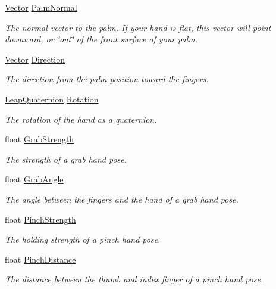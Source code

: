 \begin{DoxyCompactItemize}
\mbox{\hyperlink{struct_leap_1_1_vector}{Vector}} \mbox{\hyperlink{class_leap_1_1_hand_a32586524eb04a8d5b9ed6559285fb1d1}{Palm\+Normal}}
\begin{DoxyCompactList}\small\item\em The normal vector to the palm. If your hand is flat, this vector will point downward, or \char`\"{}out\char`\"{} of the front surface of your palm. \end{DoxyCompactList}\item 
\mbox{\hyperlink{struct_leap_1_1_vector}{Vector}} \mbox{\hyperlink{class_leap_1_1_hand_a1b743a48862aac8d04be2bb54588f3bf}{Direction}}
\begin{DoxyCompactList}\small\item\em The direction from the palm position toward the fingers. \end{DoxyCompactList}\item 
\mbox{\hyperlink{struct_leap_1_1_leap_quaternion}{Leap\+Quaternion}} \mbox{\hyperlink{class_leap_1_1_hand_ad1f22c3baf75294e2aa4d834d87fec20}{Rotation}}
\begin{DoxyCompactList}\small\item\em The rotation of the hand as a quaternion. \end{DoxyCompactList}\item 
float \mbox{\hyperlink{class_leap_1_1_hand_ae539f15a6d9021cd3161ec869a85d09e}{Grab\+Strength}}
\begin{DoxyCompactList}\small\item\em The strength of a grab hand pose. \end{DoxyCompactList}\item 
float \mbox{\hyperlink{class_leap_1_1_hand_ae459b2a6a13e6a28c9399f613849b502}{Grab\+Angle}}
\begin{DoxyCompactList}\small\item\em The angle between the fingers and the hand of a grab hand pose. \end{DoxyCompactList}\item 
float \mbox{\hyperlink{class_leap_1_1_hand_a1f615f0a7a58a53c3ff5db6d6b440d6a}{Pinch\+Strength}}
\begin{DoxyCompactList}\small\item\em The holding strength of a pinch hand pose. \end{DoxyCompactList}\item 
float \mbox{\hyperlink{class_leap_1_1_hand_aac8471ab94c8166143bd261b9ec0c9fb}{Pinch\+Distance}}
\begin{DoxyCompactList}\small\item\em The distance between the thumb and index finger of a pinch hand pose. \end{DoxyCompactList}\item 

\end{DoxyCompactItemize}
